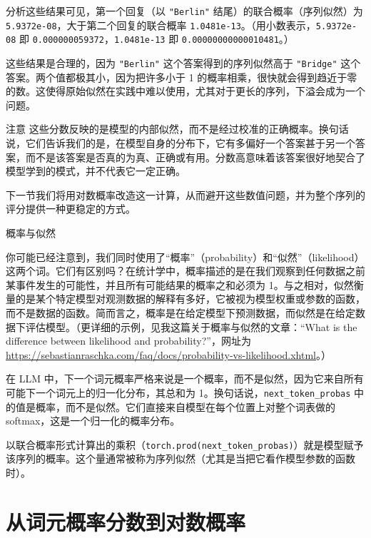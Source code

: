 分析这些结果可见，第一个回复（以 \texttt{"}\texttt{Berlin}\texttt{"} 结尾）的联合概率（序列似然）为 \texttt{5.9372e-08}，大于第二个回复的联合概率 \texttt{1.0481e-13}。（用小数表示，\texttt{5.9372e-08} 即 \texttt{0.000000059372}，\texttt{1.0481e-13} 即 \texttt{0.00000000000010481}。）

这些结果是合理的，因为 \texttt{"}\texttt{Berlin}\texttt{"} 这个答案得到的序列似然高于 \texttt{"}\texttt{Bridge}\texttt{"} 这个答案。两个值都极其小，因为把许多小于 1 的概率相乘，很快就会得到趋近于零的数。这使得原始似然在实践中难以使用，尤其对于更长的序列，下溢会成为一个问题。

\begin{myWarning}{注意}
 这些分数反映的是模型的内部似然，而不是经过校准的正确概率。换句话说，它们告诉我们的是，在模型自身的分布下，它有多偏好一个答案甚于另一个答案，而不是该答案是否真的为真、正确或有用。分数高意味着该答案很好地契合了模型学到的模式，并不代表它一定正确。\end{myWarning}

下一节我们将用对数概率改造这一计算，从而避开这些数值问题，并为整个序列的评分提供一种更稳定的方式。

\begin{mySidebar}{概率与似然}

你可能已经注意到，我们同时使用了“概率”（probability）和“似然”（likelihood）这两个词。它们有区别吗？在统计学中，概率描述的是在我们观察到任何数据之前某事件发生的可能性，并且所有可能结果的概率之和必须为 1。与之相对，似然衡量的是某个特定模型对观测数据的解释有多好，它被视为模型权重或参数的函数，而不是数据的函数。简而言之，概率是在给定模型下预测数据，而似然是在给定数据下评估模型。（更详细的示例，见我这篇关于概率与似然的文章：“What is the difference between likelihood and probability?”，网址为 \href{https://sebastianraschka.com/faq/docs/probability-vs-likelihood.xhtml}{https://sebastianraschka.com/faq/docs/probability-vs-likelihood.xhtml}。）

在 LLM 中，下一个词元概率严格来说是一个概率，而不是似然，因为它来自所有可能下一个词元上的归一化分布，其总和为 1。换句话说，\texttt{next\_token\_probas} 中的值是概率，而不是似然。它们直接来自模型在每个位置上对整个词表做的 softmax，这是一个归一化的概率分布。

以联合概率形式计算出的乘积（\texttt{torch.prod(next\_token\_probas)}）就是模型赋予该序列的概率。这个量通常被称为序列似然（尤其是当把它看作模型参数的函数时）。

\end{mySidebar}

\section{从词元概率分数到对数概率}

